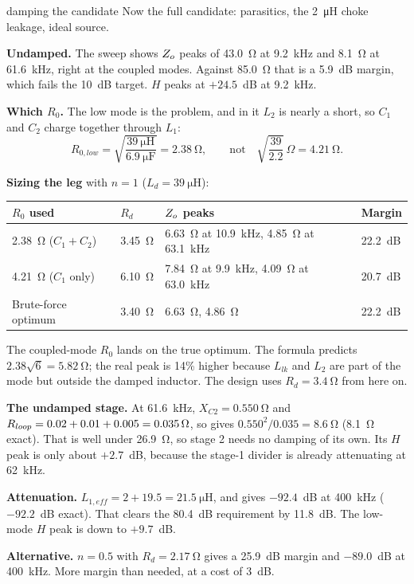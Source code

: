 \begin{examplebox}[label=ex:candidate-damped]{damping the candidate}
	Now the full candidate: parasitics, the \qty{2}{\micro\henry} choke leakage,
	ideal source.

	\textbf{Undamped.} The sweep shows $Z_o$ peaks of \qty{43.0}{\ohm} at
	\qty{9.2}{\kHz} and \qty{8.1}{\ohm} at \qty{61.6}{\kHz}, right at the coupled
	modes. Against \qty{85.0}{\ohm} that is a 5.9~dB margin, which fails the
	10~dB target. $H$ peaks at $+24.5$~dB at \qty{9.2}{\kHz}.

	\textbf{Which $R_0$.} The low mode is the problem, and in it $L_2$ is nearly a
	short, so $C_1$ and $C_2$ charge together through $L_1$:
	\[
		R_{0,low} = \sqrt{\frac{\qty{39}{\micro\henry}}{\qty{6.9}{\micro\farad}}} = \qty{2.38}{\ohm},
		\qquad \text{not} \quad \sqrt{\frac{39}{2.2}}\,\Omega = \qty{4.21}{\ohm}.
	\]

	\textbf{Sizing the leg} with $n = 1$ ($L_d = \qty{39}{\micro\henry}$):
	\begin{center}
		\small
		\begin{tabular}{@{}llll@{}}
			\toprule
			$R_0$ used                     & $R_d$            & $Z_o$ peaks                                                                & Margin  \\
			\midrule
			\qty{2.38}{\ohm} ($C_1 + C_2$) & \qty{3.45}{\ohm} & \qty{6.63}{\ohm} at \qty{10.9}{\kHz}, \qty{4.85}{\ohm} at \qty{63.1}{\kHz} & 22.2~dB \\
			\qty{4.21}{\ohm} ($C_1$ only)  & \qty{6.10}{\ohm} & \qty{7.84}{\ohm} at \qty{9.9}{\kHz}, \qty{4.09}{\ohm} at \qty{63.0}{\kHz}  & 20.7~dB \\
			Brute-force optimum            & \qty{3.40}{\ohm} & \qty{6.63}{\ohm}, \qty{4.86}{\ohm}                                         & 22.2~dB \\
			\bottomrule
		\end{tabular}
	\end{center}
	The coupled-mode $R_0$ lands on the true optimum. The formula predicts
	$2.38\sqrt{6} = \qty{5.82}{\ohm}$; the real peak is 14\% higher because
	$L_{lk}$ and $L_2$ are part of the mode but outside the damped inductor.
	The design uses $R_d = \qty{3.4}{\ohm}$ from here on.

	\textbf{The undamped stage.} At \qty{61.6}{\kHz}, $X_{C2} = \qty{0.550}{\ohm}$
	and $R_{loop} = 0.02 + 0.01 + 0.005 = \qty{0.035}{\ohm}$, so 
	gives $0.550^2/0.035 = \qty{8.6}{\ohm}$ (\qty{8.1}{\ohm} exact). That is well
	under \qty{26.9}{\ohm}, so stage 2 needs no damping of its own. Its $H$ peak is
	only about $+2.7$~dB, because the stage-1 divider is already attenuating at
	\qty{62}{\kHz}.

	\textbf{Attenuation.} $L_{1,eff} = 2 + 19.5 = \qty{21.5}{\micro\henry}$, and
	 gives $-92.4$~dB at \qty{400}{\kHz} ($-92.2$~dB exact).
	That clears the 80.4~dB requirement by 11.8~dB. The low-mode $H$ peak is
	down to $+9.7$~dB.

	\textbf{Alternative.} $n = 0.5$ with $R_d = \qty{2.17}{\ohm}$ gives a 25.9~dB
	margin and $-89.0$~dB at \qty{400}{\kHz}. More margin than needed, at a cost of 3~dB.
\end{examplebox}
